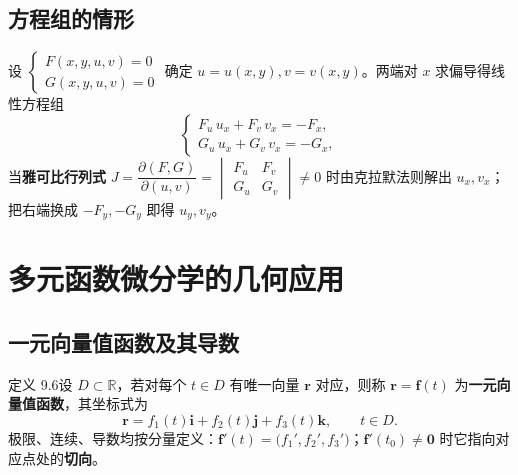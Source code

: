 
\subsection{方程组的情形}

设 $\begin{cases}F(x,y,u,v)=0\\ G(x,y,u,v)=0\end{cases}$ 确定 $u=u(x,y),v=v(x,y)$。两端对 $x$ 求偏导得线性方程组
\begin{equation}
\begin{cases}F_u\,u_x+F_v\,v_x=-F_x,\\ G_u\,u_x+G_v\,v_x=-G_x ,\end{cases}
\end{equation}
当\textbf{雅可比行列式} $J=\dfrac{\partial(F,G)}{\partial(u,v)}=\begin{vmatrix}F_u&F_v\\G_u&G_v\end{vmatrix}\neq0$ 时由克拉默法则解出 $u_x,v_x$；把右端换成 $-F_y,-G_y$ 即得 $u_y,v_y$。



\section{多元函数微分学的几何应用}

\subsection{一元向量值函数及其导数}

定义 9.6\quad 设 $D\subset\mathbb R$，若对每个 $t\in D$ 有唯一向量 $\boldsymbol r$ 对应，则称 $\boldsymbol r=\boldsymbol f(t)$ 为\textbf{一元向量值函数}，其坐标式为
\begin{equation}
\boldsymbol r=f_1(t)\boldsymbol i+f_2(t)\boldsymbol j+f_3(t)\boldsymbol k,\qquad t\in D .
\end{equation}
极限、连续、导数均按分量定义：$\boldsymbol f'(t)=\bigl(f_1',f_2',f_3'\bigr)$；$\boldsymbol f'(t_0)\neq\boldsymbol 0$ 时它指向对应点处的\textbf{切向}。

